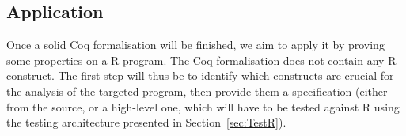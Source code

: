 \documentclass{article}
\newcommand\Coq{Coq}
\newcommand\R{R}
\begin{document}
\subsection{Application}
\label{sec:application}

Once a solid \Coq{} formalisation will be finished,
we aim to apply it by proving some properties on a \R{} program.
%
The \Coq{} formalisation does not contain any \R{} construct.
The first step will thus be to identify which constructs
are crucial for the analysis of the targeted program,
then provide them a specification
(either from the source, or a high-level one, which will have
to be tested against \R{} using the testing architecture
presented in Section~\ref{sec:TestR}).


\printbibliography
\end{document}
